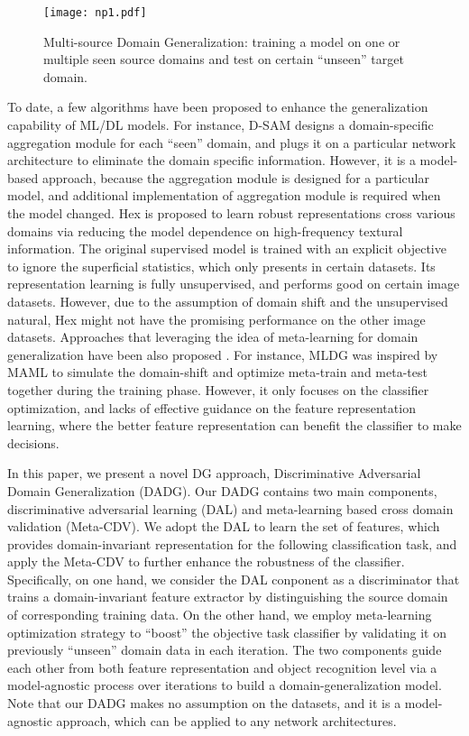 \documentclass[twocolumn,preprint]{elsarticle}
\begin{document}
\begin{figure}[t]
  \centering
  \texttt{[image: np1.pdf]}
  \caption{Multi-source Domain Generalization: training a model on one or multiple seen source domains and test on certain ``unseen'' target domain.}
\label{DGdiagram}
\end{figure}

To date, a few algorithms have been proposed to enhance the generalization capability of ML/DL models. For instance,
D-SAM \cite{dsam} designs a domain-specific aggregation module for each ``seen'' domain, and plugs it on a particular network architecture to eliminate the domain specific information. However, it is a model-based approach, because the aggregation module is designed for a particular model, and additional implementation of aggregation module is required when the model changed.
Hex \cite{hex} is proposed to learn robust representations cross various domains via reducing the model dependence on high-frequency textural information. The original supervised model is trained with an explicit objective to ignore the superficial statistics, which only presents in certain datasets. Its representation learning is fully unsupervised, and performs good on certain image datasets. However, due to the assumption of domain shift and the unsupervised natural, Hex might not have the promising performance on the other image datasets. 
Approaches that leveraging the idea of meta-learning for domain generalization have been also proposed \cite{mldg, feature-critic, metareg}. For instance, MLDG \cite{mldg} was inspired by MAML \cite{maml} to simulate the domain-shift and optimize meta-train and meta-test together during the training phase. However, it only focuses on the classifier optimization, and lacks of effective guidance on the feature representation learning, where the better feature representation can benefit the classifier to make decisions. 

In this paper, we present a novel DG approach, Discriminative Adversarial Domain Generalization (DADG). 
Our DADG contains two main components, discriminative adversarial learning (DAL) and meta-learning based cross domain validation (Meta-CDV). 
We adopt the DAL to learn the set of features, which provides domain-invariant representation for the following classification task, and apply the Meta-CDV to further enhance the robustness of the classifier.
Specifically, on one hand, we consider the DAL conponent as a discriminator that trains a domain-invariant feature extractor by distinguishing the source domain of corresponding training data. 
On the other hand, we employ meta-learning optimization strategy to ``boost'' the objective task classifier by validating it on previously ``unseen'' domain data in each iteration.
The two components guide each other from both feature representation and object recognition level via a model-agnostic process over iterations to build a domain-generalization model.
Note that our DADG makes no assumption on the datasets, and it is a model-agnostic approach, which can be applied to any network architectures.
\end{document}
